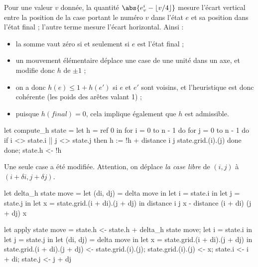 \begin{ques}
  Pour une valeur $v$ donnée, la quantité
  $\abs{e_{v}^{i} - \lfloor v / 4 \rfloor}$ mesure l'écart vertical
  entre la position de la case portant le numéro $v$ dans l'état $e$
  et sa position dans l'état final ; l'autre terme mesure l'écart horizontal.
  Ainsi :
  \begin{itemize}
    \item la somme vaut zéro si et seulement si $e$ est l'état final ;
    \item un mouvement élémentaire déplace une case de une unité dans un axe,
          et modifie donc $h$ de $\pm 1$ ;
    \item on a donc $h(e) \leq 1 + h(e')$ si $e$ et $e'$ sont voisins,
          et l'heuristique est donc cohérente (les poids des arêtes valant 1) ;
    \item puisque $h(final) = 0$, cela implique également que $h$ est
          admissible.
  \end{itemize}
\end{ques}

\begin{ques}
\begin{ocaml}
let compute_h state =
  let h = ref 0 in
  for i = 0 to n - 1 do
    for j = 0 to n - 1 do
      if i <> state.i || j <> state.j then
        h := !h + distance i j state.grid.(i).(j)
    done
  done;
  state.h <- !h
\end{ocaml}
\end{ques}

\begin{ques}
  Une seule case a été modifiée. Attention, on déplace \emph{la case libre}
  de $(i, j)$ à $(i + \delta i, j + \delta j)$.
\begin{ocaml}
let delta_h state move =
  let (di, dj) = delta move in
  let i = state.i in
  let j = state.j in
  let x = state.grid.(i + di).(j + dj) in
  distance i j x - distance (i + di) (j + dj) x
\end{ocaml}
\end{ques}

\begin{ques}
\begin{ocaml}
let apply state move =
  state.h <- state.h + delta_h state move;
  let i = state.i in
  let j = state.j in
  let (di, dj) = delta move in
  let x = state.grid.(i + di).(j + dj) in
  state.grid.(i + di).(j + dj) <- state.grid.(i).(j);
  state.grid.(i).(j) <- x;
  state.i <- i + di;
  state.j <- j + dj
\end{ocaml}
\end{ques}

